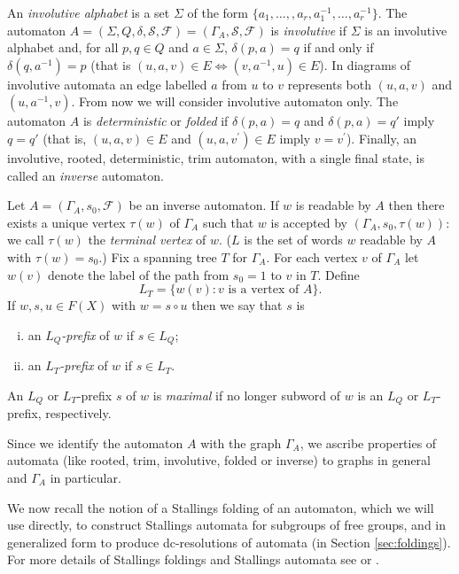 \documentclass[a4paper,12pt]{article}
\newcommand{\G}{\Gamma }
\renewcommand{\d}{\delta }
\renewcommand{\S}{\Sigma }
\renewcommand{\t}{\tau }
\newcommand{\cF}{{\cal{F}}}
\numberwithin{equation}{section}
\numberwithin{figure}{section}
\renewcommand{\cF}{\mathcal{F}}
\newcommand{\be}{\begin{enumerate}}
\newcommand{\ee}{\end{enumerate}}
\begin{document}
An {\em involutive alphabet} is a set $\S$ of the form $\{a_1, \ldots, ,
a_r, a_1^{-1}, \ldots, a_r^{-1}\}$.
The automaton $A =(\S, Q, \d,\mathcal{S},\mathcal{F})
= (\G_A, \mathcal{S}, \mathcal{F})$ is {\em
involutive} if $\S$ is an
involutive alphabet and, for all $p, q \in Q$ and $a \in \S$,
$\d(p,a)=q$ if and only if $\d(q, a^{-1})=p$ (that is $(u, a, v) \in E
\Leftrightarrow (v, a^{-1}, u) \in E$). 
In diagrams of involutive automata an edge labelled $a$  from 
$u$ to $v$  represents
both $(u,a,v)$ and $(u,a^{-1},v)$.  From now we will
consider involutive automaton only. 
The automaton $A$ 
is {\em deterministic}  or {\em folded} if $\d(p,a)=q$ and
$\d(p,a)=q'$ imply $q=q'$ (that is, $(u, a, v)
\in E$ and $(u, a, v^\prime) \in E$ imply $v=v^\prime$). 
Finally, an involutive, rooted, 
deterministic, trim automaton, with a single final state, is called 
an {\em inverse} automaton. 

Let $A=(\G_A,s_0,\cF)$ be an inverse automaton. 
If $w$ is readable by $A$ then there exists a
unique vertex  $\t(w)$ of $\G_A$ such that $w$ is accepted by 
$(\G_A,s_0,\t(w))$: we call $\t(w)$ the {\em terminal vertex} of $w$. ($L$ is the set of words $w$ readable by $A$ with 
$\t(w)=s_0$.) 
Fix a spanning tree $T$ for $\G_A$. For each vertex $v$ of $\G_A$
let $w(v)$ denote the label of the path from $s_0=1$ to $v$ in
$T$.  Define
\[L_T=\{w(v): v \textrm{ is a vertex of } A\}.\]
If $w, s, u\in F(X)$ with $w=s\circ u$ then we say that $s$ is 
\be[(i)]
\item
 an $L_Q${\em -prefix} of $w$ if $s\in L_Q$;  
\item 
an %
$L_T${\em -prefix} of $w$ if $s\in L_T$.
\ee
An $L_Q$ or $L_T$-prefix $s$ of $w$ is  {\em maximal} if no longer
subword of $w$ is an $L_Q$ or $L_T$-prefix, respectively. 

Since we identify the automaton $A$ with the graph $\G_A$, we ascribe
properties of automata (like rooted, trim, involutive, folded or
inverse) to graphs in general and $\G_A$ in particular.

We now recall the notion of a Stallings folding of an
automaton, which we will use directly, to construct Stallings 
automata for subgroups of free groups, and in generalized form
to produce dc-resolutions of automata (in Section
\ref{sec:foldings}). For more details of Stallings foldings  and  Stallings 
automata  see \cite{ventura11} or \cite{BartholdiSilva}.
\end{document}
